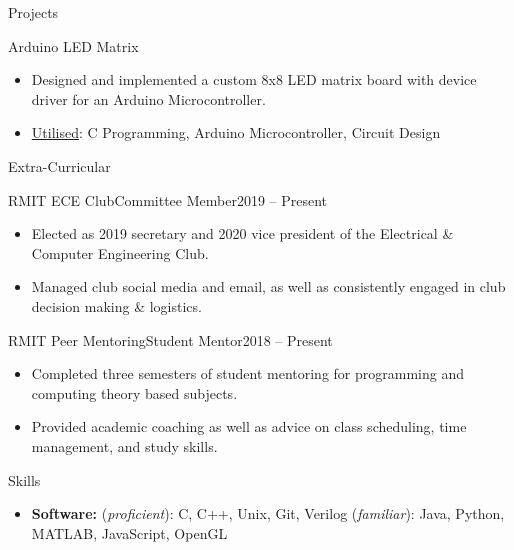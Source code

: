 \documentclass[]{mcdowellcv}
\begin{document}
\begin{cvsection}{Projects}
		\begin{cvsubsection}{Arduino LED Matrix}{}{}
			\begin{itemize}
				\item Designed and implemented a custom 8x8 LED matrix board with device driver for an Arduino Microcontroller.
				\item \underline{Utilised}: C Programming, Arduino Microcontroller, Circuit Design
			\end{itemize}
		\end{cvsubsection}

	\end{cvsection}

	\begin{cvsection}{Extra-Curricular}
		\begin{cvsubsection}{RMIT ECE Club}{Committee Member}{2019 -- Present}
			\begin{itemize}
				\item Elected as 2019 secretary and 2020 vice president of the Electrical \& Computer Engineering Club.
				\item Managed club social media and email, as well as consistently engaged in club decision making \& logistics.
			\end{itemize}
		\end{cvsubsection}

		\begin{cvsubsection}{RMIT Peer Mentoring}{Student Mentor}{2018 -- Present}
			\begin{itemize}
				\item Completed three semesters of student mentoring for programming and computing theory based subjects.
				\item Provided academic coaching as well as advice on class scheduling, time management, and study skills.
			\end{itemize}
		\end{cvsubsection}
	\end{cvsection}

	\begin{cvsection}{Skills}
		\begin{cvsubsection}{}{}{}
			\begin{itemize}
				\item \textbf{Software:} (\emph{proficient}): C, C++, Unix, Git, Verilog (\emph{familiar}): Java, Python, MATLAB, JavaScript, OpenGL
			\end{itemize}
		\end{cvsubsection}
	\end{cvsection}
\end{document}
